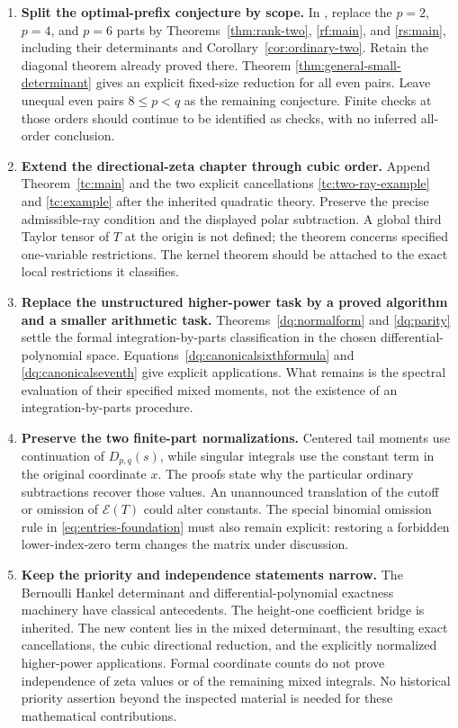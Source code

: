 \begin{enumerate}[leftmargin=*,label=\arabic*.]
\item \textbf{Split the optimal-prefix conjecture by scope.}
In \cite[\texttt{conj:firstq}]{CanonicalFifth}, replace the $p=2$,
$p=4$, and $p=6$ parts by Theorems~\ref{thm:rank-two}, \ref{rf:main},
and \ref{rs:main},
including their determinants and Corollary~\ref{cor:ordinary-two}.
Retain the diagonal theorem already proved there. Theorem
\ref{thm:general-small-determinant} gives an explicit fixed-size
reduction for all even pairs. Leave unequal even pairs $8\le p<q$
as the remaining conjecture. Finite checks at those orders should continue to be identified
as checks, with no inferred all-order conclusion.

\item \textbf{Extend the directional-zeta chapter through cubic order.}
Append Theorem~\ref{tc:main} and the two explicit cancellations
\eqref{tc:two-ray-example} and \eqref{tc:example} after the inherited
quadratic theory. Preserve the precise admissible-ray condition and
the displayed polar subtraction. A global third Taylor tensor of $T$
at the origin is not defined; the theorem concerns specified one-variable
restrictions. The kernel theorem should be attached to the exact local
restrictions it classifies.

\item \textbf{Replace the unstructured higher-power task by a proved
algorithm and a smaller arithmetic task.}
Theorems~\ref{dq:normalform} and \ref{dq:parity} settle the formal
integration-by-parts classification in the chosen differential-polynomial
space. Equations~\eqref{dq:canonicalsixthformula} and
\eqref{dq:canonicalseventh} give explicit applications. What remains is
the spectral evaluation of their specified mixed moments, not the
existence of an integration-by-parts procedure.

\item \textbf{Preserve the two finite-part normalizations.}
Centered tail moments use continuation of $D_{p,q}(s)$, while singular
integrals use the constant term in the original coordinate $x$.
The proofs state why the particular ordinary subtractions recover those
values. An unannounced translation of the cutoff or omission of
$\mathcal E(T)$ could alter constants. The special binomial omission
rule in \eqref{eq:entries-foundation} must also remain explicit: restoring
a forbidden lower-index-zero term changes the matrix under discussion.

\item \textbf{Keep the priority and independence statements narrow.}
The Bernoulli Hankel determinant and differential-polynomial exactness
machinery have classical antecedents. The height-one coefficient bridge
is inherited. The new content lies in the mixed determinant, the
resulting exact cancellations, the cubic directional reduction, and the
explicitly normalized higher-power applications. Formal coordinate counts
do not prove independence of zeta values or of the remaining mixed
integrals. No historical priority assertion beyond the inspected material
is needed for these mathematical contributions.
\end{enumerate}


